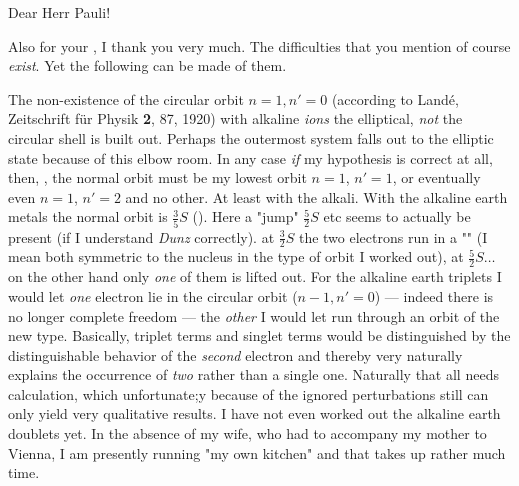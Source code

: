 \begin{letter}{9}
\begin{header}
\date{1921/02/13}

\makeheader

\end{header}

Dear Herr Pauli!

Also for your , I thank you very much. The difficulties that you mention of course \textit{exist}. Yet the following  can be made of them.

The non-existence of the circular orbit $n=1, n'=0$  (according to Land\'e, Zeitschrift f\"ur Physik \textbf{2}, 87, 1920) with alkaline \textit{ions} the elliptical, \textit{not} the circular shell is built out. Perhaps the outermost system falls out to the elliptic state because of this elbow room. In any case \textit{if} my hypothesis is correct at all, then, , the normal orbit must be my lowest orbit $n=1$, $n'=1$, or eventually even $n=1$, $n'=2$ and no other. At least with the alkali. With the alkaline earth metals the normal orbit is $\frac{3}{5}S$ (). Here a "jump"  $\frac{5}{2}S$ etc seems to actually be present (if I understand \textit{Dunz} correctly).  at $\frac{3}{2}S$ the two electrons run in a "" (I mean both symmetric to the nucleus in the type of orbit I worked out), at $\frac{5}{2}S\dots$ on the other hand only \textit{one} of them is lifted out. For the alkaline earth triplets I would let \textit{one} electron lie in the circular orbit ($n-1,n'=0$) — indeed there is no longer complete freedom — the \textit{other} I would let run through an orbit of the new type. Basically, triplet terms and singlet terms would be distinguished by the distinguishable behavior of the \textit{second} electron and thereby very naturally explains the occurrence of \textit{two}  rather than a single one.
Naturally that all needs calculation, which unfortunate;y because of the ignored perturbations still can only yield very qualitative results. I have not even worked out the alkaline earth doublets yet. In the absence of my wife, who had to accompany my mother to Vienna, I am presently running "my own kitchen" and that takes up rather much time.


\end{letter}
